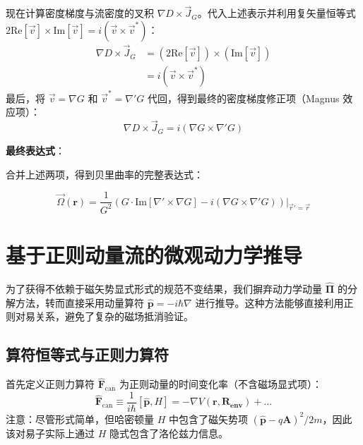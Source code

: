 \documentclass[a4paper,12pt]{article}
\begin{document}
现在计算密度梯度与流密度的叉积 $\nabla D \times \vec{J}_G$。代入上述表示并利用复矢量恒等式 $2\text{Re}[\vec{v}] \times \text{Im}[\vec{v}] = i(\vec{v} \times \vec{v}^*)$：
\begin{equation}
    \begin{aligned}
        \nabla D \times \vec{J}_G &= (2\text{Re}[\vec{v}]) \times (\text{Im}[\vec{v}]) \\
        &= i(\vec{v} \times \vec{v}^*)
    \end{aligned}
\end{equation}
最后，将 $\vec{v} = \nabla G$ 和 $\vec{v}^* = \nabla' G$ 代回，得到最终的密度梯度修正项（Magnus 效应项）：
\begin{equation}
    \nabla D \times \vec{J}_G = i(\nabla G \times \nabla' G)
\end{equation}

\textbf{最终表达式}：

合并上述两项，得到贝里曲率的完整表达式：

\begin{equation}
    \boxed{
    \vec{\Omega}(\mathbf{r}) = \frac{1}{G^2} \left( G \cdot \text{Im}[\nabla' \times \nabla G] - i (\nabla G \times \nabla' G) \right) \Bigg|_{\vec{r}'=\vec{r}}
    }
    \label{eq:berry_general}
\end{equation}
\section{基于正则动量流的微观动力学推导}

为了获得不依赖于磁矢势显式形式的规范不变结果，我们摒弃动力学动量 $\hat{\bm{\Pi}}$ 的分解方法，转而直接采用动量算符 $\hat{\mathbf{p}} = -i\hbar \nabla$ 进行推导。这种方法能够直接利用正则对易关系，避免了复杂的磁场抵消验证。

\subsection{算符恒等式与正则力算符}

首先定义正则力算符 $\hat{\mathbf{F}}_{\text{can}}$ 为正则动量的时间变化率（不含磁场显式项）：
\begin{equation}
    \hat{\mathbf{F}}_{\text{can}} \equiv \frac{1}{i\hbar}[\hat{\mathbf{p}}, H] = -\nabla V(\mathbf{r,R_{env}}) + \dots
\end{equation}
注意：尽管形式简单，但哈密顿量 $H$ 中包含了磁矢势项 $(\hat{\mathbf{p}}-q\mathbf{A})^2/2m$，因此该对易子实际上通过 $H$ 隐式包含了洛伦兹力信息。
\end{document}
